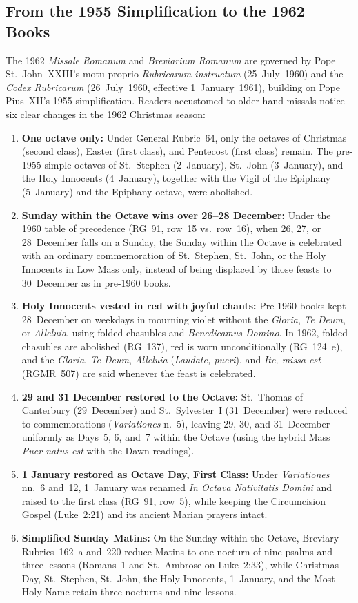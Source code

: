 \subsection{From the 1955 Simplification to the 1962 Books}

The 1962 \textit{Missale Romanum} and \textit{Breviarium Romanum} are governed
by Pope St.~John~XXIII's motu proprio \textit{Rubricarum instructum}
(25~July~1960) and the \textit{Codex Rubricarum} (26~July~1960, effective
1~January~1961), building on Pope Pius~XII's 1955 simplification. Readers
accustomed to older hand missals notice six clear changes in the 1962 Christmas
season:

\begin{enumerate}
\item \textbf{One octave only:} Under General Rubric~64, only the octaves of
Christmas (second class), Easter (first class), and Pentecost (first class)
remain. The pre-1955 simple octaves of St.~Stephen (2~January), St.~John
(3~January), and the Holy Innocents (4~January), together with the Vigil of the
Epiphany (5~January) and the Epiphany octave, were abolished.
\item \textbf{Sunday within the Octave wins over 26--28 December:} Under the
1960 table of precedence (RG~91, row~15 vs.\ row~16), when 26, 27, or
28~December falls on a Sunday, the Sunday within the Octave is celebrated with
an ordinary commemoration of St.~Stephen, St.~John, or the Holy Innocents in Low
Mass only, instead of being displaced by those feasts to 30~December as in
pre-1960 books.
\item \textbf{Holy Innocents vested in red with joyful chants:} Pre-1960 books
kept 28~December on weekdays in mourning violet without the \textit{Gloria},
\textit{Te Deum}, or \textit{Alleluia}, using folded chasubles and
\textit{Benedicamus Domino}. In 1962, folded chasubles are abolished (RG~137),
red is worn unconditionally (RG~124~e), and the \textit{Gloria}, \textit{Te
Deum}, \textit{Alleluia} (\textit{Laudate, pueri}), and \textit{Ite, missa est}
(RGMR~507) are said whenever the feast is celebrated.
\item \textbf{29 and 31 December restored to the Octave:} St.~Thomas of
Canterbury (29~December) and St.~Sylvester~I (31~December) were reduced to
commemorations (\textit{Variationes} n.~5), leaving 29, 30, and 31~December
uniformly as Days~5, 6, and~7 within the Octave (using the hybrid Mass
\textit{Puer natus est} with the Dawn readings).
\item \textbf{1 January restored as Octave Day, First Class:} Under
\textit{Variationes} nn.~6 and~12, 1~January was renamed \textit{In Octava
Nativitatis Domini} and raised to the first class (RG~91, row~5), while keeping
the Circumcision Gospel (Luke~2:21) and its ancient Marian prayers intact.
\item \textbf{Simplified Sunday Matins:} On the Sunday within the Octave,
Breviary Rubrics~162~a and~220 reduce Matins to one nocturn of nine psalms and
three lessons (Romans~1 and St.~Ambrose on Luke~2:33), while Christmas Day,
St.~Stephen, St.~John, the Holy Innocents, 1~January, and the Most Holy Name
retain three nocturns and nine lessons.
\end{enumerate}

